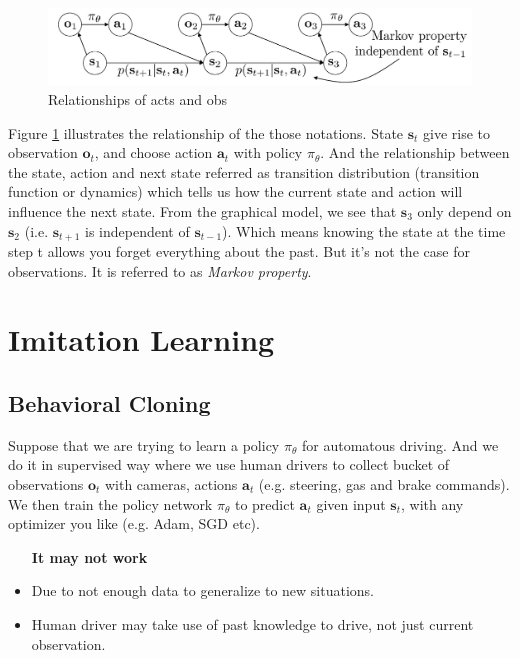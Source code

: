 \documentclass[nobib]{tufte-handout}
\begin{document}

\begin{figure}
  \includegraphics[width = 10 cm]{markov-prob}
  \caption{Relationships of acts and obs}
  \label{fig:markov-prob}
\end{figure}

Figure \ref{fig:markov-prob} illustrates the relationship of the those notations. State $\mathbf{s}_t$ give rise to observation $\mathbf{o}_t$, and choose action $\mathbf{a}_t$ with policy $\pi_\theta$. And the relationship between the state, action and next state referred as transition distribution (transition function or dynamics) which tells us how the current state and action will influence the next state. From the graphical model, we see that $\mathbf{s}_3$ only depend on $\mathbf{s}_2$ (i.e. $\mathbf{s}_{t+1}$ is independent of $\mathbf{s}_{t-1} $). Which means knowing the state at the time step t allows you forget everything about the past. But it's not the case for observations. It is referred to as \emph{Markov property}.

\section{Imitation Learning}

\subsection{Behavioral Cloning}

Suppose that we are trying to learn a policy $\pi_\theta$ for automatous driving. And we do it in supervised way where we use human drivers to collect bucket of observations $\mathbf{o}_t$ with cameras, actions $\mathbf{a}_t$ (e.g. steering, gas and brake commands). We then train the policy network $\pi_\theta$ to predict $\mathbf{a}_t$ given input $\mathbf{s}_t$, with any optimizer you like (e.g. Adam, SGD etc).

\begin{itemize}
  \item[\textbf{It may not work}]
  \item Due to not enough data to generalize to new situations.
  \item Human driver may take use of past knowledge to drive, not just current observation.
\end{itemize}
\end{document}
